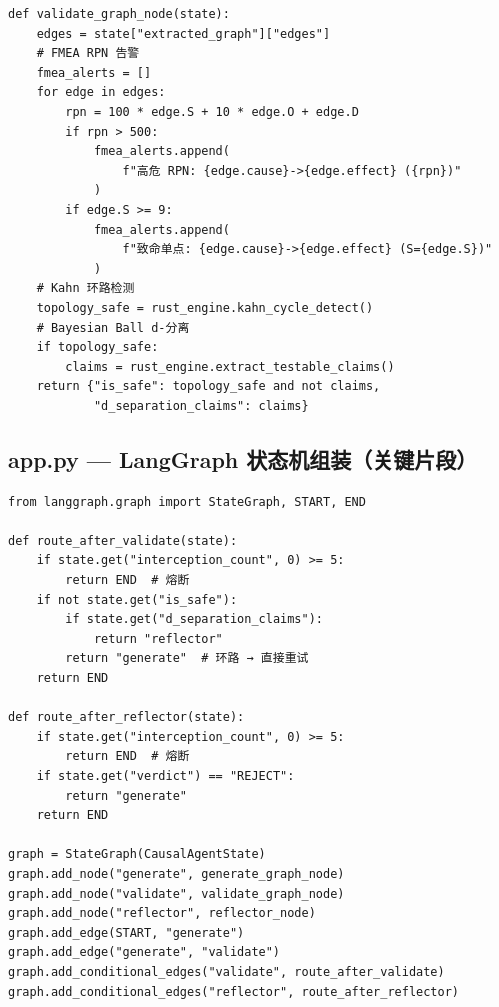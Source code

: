 \documentclass[12pt, a4paper]{ctexart}
\begin{document}
\begin{lstlisting}[style=python, caption={Validator 节点：FMEA 风险告警逻辑}]
def validate_graph_node(state):
    edges = state["extracted_graph"]["edges"]
    # FMEA RPN 告警
    fmea_alerts = []
    for edge in edges:
        rpn = 100 * edge.S + 10 * edge.O + edge.D
        if rpn > 500:
            fmea_alerts.append(
                f"高危 RPN: {edge.cause}->{edge.effect} ({rpn})"
            )
        if edge.S >= 9:
            fmea_alerts.append(
                f"致命单点: {edge.cause}->{edge.effect} (S={edge.S})"
            )
    # Kahn 环路检测
    topology_safe = rust_engine.kahn_cycle_detect()
    # Bayesian Ball d-分离
    if topology_safe:
        claims = rust_engine.extract_testable_claims()
    return {"is_safe": topology_safe and not claims,
            "d_separation_claims": claims}
\end{lstlisting}

\subsection{app.py — LangGraph 状态机组装（关键片段）}

\begin{lstlisting}[style=python, caption={LangGraph 状态机路由逻辑}]
from langgraph.graph import StateGraph, START, END

def route_after_validate(state):
    if state.get("interception_count", 0) >= 5:
        return END  # 熔断
    if not state.get("is_safe"):
        if state.get("d_separation_claims"):
            return "reflector"
        return "generate"  # 环路 → 直接重试
    return END

def route_after_reflector(state):
    if state.get("interception_count", 0) >= 5:
        return END  # 熔断
    if state.get("verdict") == "REJECT":
        return "generate"
    return END

graph = StateGraph(CausalAgentState)
graph.add_node("generate", generate_graph_node)
graph.add_node("validate", validate_graph_node)
graph.add_node("reflector", reflector_node)
graph.add_edge(START, "generate")
graph.add_edge("generate", "validate")
graph.add_conditional_edges("validate", route_after_validate)
graph.add_conditional_edges("reflector", route_after_reflector)
\end{lstlisting}
\end{document}
